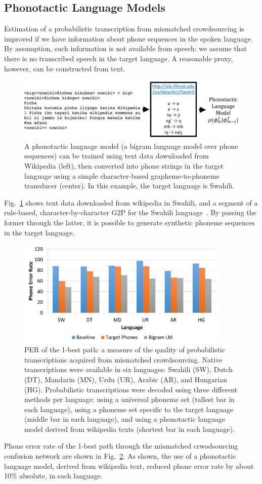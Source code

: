 \subsection{Phonotactic Language Models}
\label{sec:phonotactic}

Estimation of a probabilistic transcription from mismatched
crowdsourcing is improved if we have information about phone sequences
in the spoken language. By assumption, such information is not
available from speech: we assume that there is no transcribed speech
in the target language.  A reasonable proxy, however, can be
constructed from text.

\begin{figure}
  \centerline{\includegraphics[width=5in]{../figs/fig_sloan.png}}
  \caption{A phonotactic language model (a bigram language model over
    phone sequences) can be trained using text data downloaded from
    Wikipedia (left), then converted into phone strings in the target
    language using a simple character-based grapheme-to-phoneme
    transducer (center).  In this example, the target language is
    Swahili.}
  \label{fig:wikitext}
\end{figure}

Fig.~\ref{fig:wikitext} shows text data downloaded from wikipedia in
Swahili, and a segment of a rule-based, character-by-character G2P for
the Swahili language~\cite{Hasegawajohnson15}.  By passing the former
through the latter, it is possible to generate synthetic phoneme
sequences in the target language.

\begin{figure}
  \centerline{\includegraphics[width=4in]{../figs/sloan2.png}}
  \caption{PER of the 1-best path: a measure of the quality of
    probabilistic transcriptions acquired from mismatched
    crowdsourcing.  Native transcriptions were available in six
    languages: Swahili (SW), Dutch (DT), Mandarin (MN), Urdu (UR),
    Arabic (AR), and Hungarian (HG).  Probabilistic transcriptions
    were decoded using three different methods per language: using a
    universal phoneme set (tallest bar in each language), using a
    phoneme set specific to the target language (middle bar in each
    language), and using a phonotactic language model derived from
    wikipedia texts (shortest bar in each language).}
  \label{fig:pt_decode_per}
\end{figure}

Phone error rate of the 1-best path through the mismatched
crwodsourcing confusion network are shown in
Fig.~\ref{fig:pt_decode_per}.  As shown, the use of a phonotactic
language model, derived from wikipedia text, reduced phone error rate
by about 10\% absolute, in each language.

